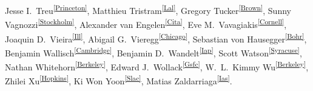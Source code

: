 \begin{raggedright}
Jesse I.~Treu\textsuperscript{\ref{Princeton}},
Matthieu Tristram\textsuperscript{\ref{Lal}},
Gregory Tucker\textsuperscript{\ref{Brown}},
Sunny Vagnozzi\textsuperscript{\ref{Stockholm}},
Alexander van Engelen\textsuperscript{\ref{Cita}},
Eve M.~Vavagiakis\textsuperscript{\ref{Cornell}},
Joaquin D.~Vieira\textsuperscript{\ref{Ill}},
Abigail G.~Vieregg\textsuperscript{\ref{Chicago}}, 
Sebastian von Hausegger\textsuperscript{\ref{Bohr}},
Benjamin Wallisch\textsuperscript{\ref{Cambridge}},
Benjamin D.~Wandelt\textsuperscript{\ref{Iap}},
Scott Watson\textsuperscript{\ref{Syracuse}},
Nathan Whitehorn\textsuperscript{\ref{Berkeley}},
Edward J.~Wollack\textsuperscript{\ref{Gsfc}},
W.~L.~Kimmy Wu\textsuperscript{\ref{Berkeley}},
Zhilei Xu\textsuperscript{\ref{Hopkins}},
Ki Won Yoon\textsuperscript{\ref{Slac}},
Matias Zaldarriaga\textsuperscript{\ref{Ias}}.
\end{raggedright}

\clearpage

